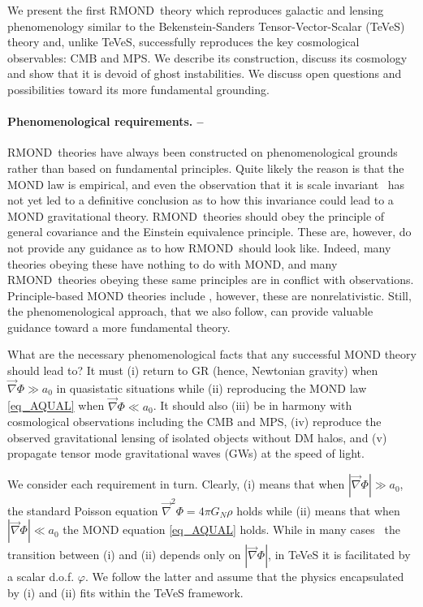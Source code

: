 \documentclass[twocolumn,prl,preprintnumbers,amsmath,amssymb,nofootinbib]{revtex4-2}
\newcommand{\grad}{\ensuremath{\vec{\nabla}}}
\newcommand{\RMOND}{RMOND~}
\newcommand{\GN}{\ensuremath{G_{N}}}
\begin{document}
We present the first \RMOND theory which reproduces galactic and lensing phenomenology 
similar to the Bekenstein-Sanders Tensor-Vector-Scalar (TeVeS) theory \cite{Sanders1997,Bekenstein2004} and, unlike TeVeS,
 successfully reproduces the key cosmological observables: CMB and MPS. We describe its construction, discuss its cosmology and show that 
it is devoid of ghost instabilities. We discuss open questions
and possibilities toward its more fundamental grounding.

\paragraph{Phenomenological requirements. --} 
\RMOND theories have always been constructed on phenomenological grounds rather than based 
on fundamental principles. Quite likely the reason is that the MOND law is empirical, and even the observation that 
it is scale invariant~\cite{Milgrom1997,Milgrom2008} has not yet led to a definitive conclusion as to how this invariance 
could lead to a MOND gravitational theory. \RMOND theories should obey the principle of general covariance 
and the Einstein equivalence principle. These are, however, 
do not provide any guidance as to how \RMOND  should look like. Indeed, many theories obeying these have 
nothing to do with MOND, and many \RMOND theories obeying these same principles are in conflict with observations.
Principle-based MOND theories include \cite{Milgrom:1998sy,Klinkhamer:2011un,Verlinde2016}, however, these are nonrelativistic. 
Still, the phenomenological approach, that we also follow, can provide valuable guidance toward a more fundamental theory.

What are the necessary phenomenological facts that any successful MOND theory should lead to? 
It must (i) return to GR (hence, Newtonian gravity) when $\grad\Phi\gg a_0$ in quasistatic situations while (ii)
 reproducing the MOND law \eqref{eq_AQUAL} when $\grad\Phi \ll a_0$.
It should also (iii) be in harmony with cosmological observations including the CMB and MPS,
(iv) reproduce the observed gravitational lensing of isolated objects without DM halos,
and (v) propagate tensor mode gravitational waves (GWs) at the speed of light.

We consider each requirement in turn. 
 Clearly, (i) means that when $|\grad \Phi| \gg a_0$, the standard Poisson equation $\grad^2\Phi = 4\pi \GN \rho$ holds while (ii) means that
when $|\grad \Phi| \ll a_0$ the MOND equation \eqref{eq_AQUAL} holds.
While in  many cases~\cite{DeffayetEsposito-FareseWoodard2011,Woodard2014,ZlosnikFerreiraStarkman2006}
 the transition between (i) and (ii) depends only on $|\grad \Phi|$, in TeVeS it is facilitated by
a scalar d.o.f. $\varphi$. We follow the latter and assume that the physics encapsulated by (i) and (ii) fits within the TeVeS framework.
\end{document}
